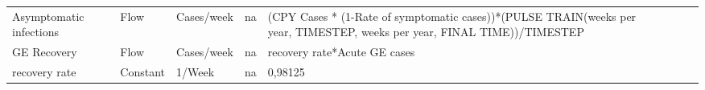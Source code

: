 \begin{landscape}
\begin{longtable}[c]{m{10em}lllm{15em}lll}
Asymptomatic infections                       & Flow     & Cases/week               & na                        & (CPY Cases * (1-Rate of symptomatic cases))*(PULSE TRAIN(weeks per year, TIMESTEP, weeks per year, FINAL TIME))/TIMESTEP                                                                                                                                                                 &                                                                                                                                                                                              &                                                                                                                                                                                                                                       \\
GE Recovery                                   & Flow     & Cases/week               & na                        & recovery rate*Acute GE cases                                                                                                                                                                                                                                                             &                                                                                                                                                                                              &                                                                                                                                                                                                                                       \\
recovery rate                                 & Constant & 1/Week                   & na                        & 0,98125                                                                                                                                                                                                                                                                                  &                                                                                                                                                                                              &                                                                                                                                                                                                                                       \\

\end{longtable}
\end{landscape}
